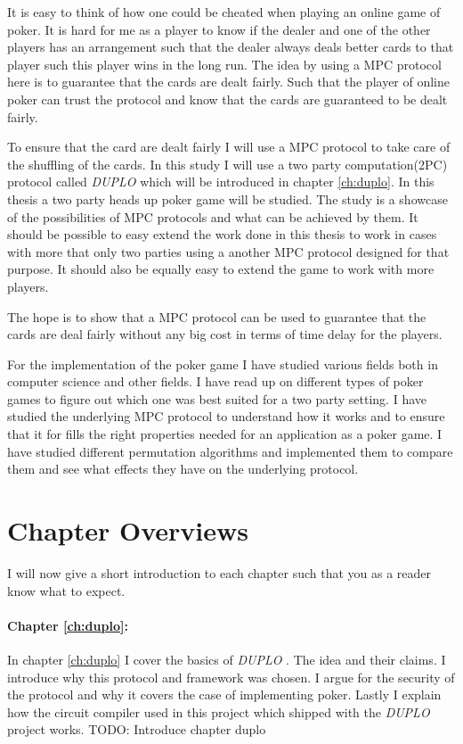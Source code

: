 \documentclass[twoside,11pt,openright]{report}
\newcommand{\todo}[1]{}
\renewcommand{\todo}[1]{{\color{red} TODO: {#1}} \\}
\newcommand{\DUPLO}{\textit{DUPLO} }
\begin{document}
It is easy to think of how one could be cheated when playing an online game of poker. It is hard for me as a player to know if the dealer and one of the other players has an arrangement such that the dealer always deals better cards to that player such this player wins in the long run. The idea by using a MPC protocol here is to guarantee that the cards are dealt fairly. Such that the player of online poker can trust the protocol and know that the cards are guaranteed to be dealt fairly.

To ensure that the card are dealt fairly I will use a MPC protocol to take care of the shuffling of the cards. In this study I will use a two party computation(2PC) protocol called \DUPLO which will be introduced in chapter \ref{ch:duplo}. In this thesis a two party heads up poker game will be studied. The study is a showcase of the possibilities of MPC protocols and what can be achieved by them. It should be possible to easy extend the work done in this thesis to work in cases with more that only two parties using a another MPC protocol designed for that purpose. It should also be equally easy to extend the game to work with more players.

The hope is to show that a MPC protocol can be used to guarantee that the cards are deal fairly without any big cost in terms of time delay for the players.

\bigskip

For the implementation of the poker game I have studied various fields both in computer science and other fields. I have read up on different types of poker games to figure out which one was best suited for a two party setting. I have studied the underlying MPC protocol to understand how it works and to ensure that it for fills the right properties needed for an application as a poker game. I have studied different permutation algorithms and implemented them to compare them and see what effects they have on the underlying protocol.

\section{Chapter Overviews}

I will now give a short introduction to each chapter such that you as a reader know what to expect. 

\paragraph{Chapter \ref{ch:duplo}:}
In chapter \ref{ch:duplo} I cover the basics of \DUPLO. The idea and their claims. I introduce why this protocol and framework was chosen. I argue for the security of the protocol and why it covers the case of implementing poker. Lastly I explain how the circuit compiler used in this project which shipped with the \DUPLO project works.
\todo{Introduce chapter duplo}
\end{document}
